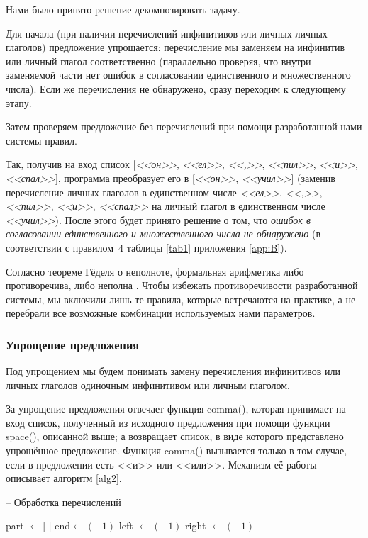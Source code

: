 \documentclass[main]{subfiles}
\begin{document}
Нами было принято решение декомпозировать задачу. 

Для начала (при наличии перечислений инфинитивов или личных личных глаголов) предложение упрощается: перечисление мы заменяем на инфинитив или личный глагол соответственно (параллельно проверяя, что внутри заменяемой части нет ошибок в согласовании единственного и множественного числа). Если же перечисления не обнаружено, сразу переходим к следующему этапу.

Затем проверяем предложение без перечислений при помощи разработанной нами системы правил. 

Так, получив на вход список [\textit{<<он>>}, \textit{<<ел>>}, \textit{<<,>>}, \textit{<<пил>>}, \textit{<<и>>}, \textit{<<спал>>}], программа преобразует его в [\textit{<<он>>}, \textit{<<учил>>}] (заменив перечисление личных глаголов в единственном числе \textit{<<ел>>}, \textit{<<,>>}, \textit{<<пил>>}, \textit{<<и>>}, \textit{<<спал>>} на личный глагол в единственном числе \textit{<<учил>>}). После этого будет принято решение о том, что \textit{ошибок в согласовании единственного и множественного числа не обнаружено} (в соответствии с правилом~4 таблицы \ref{tab1} приложения \ref{app:B}).

Согласно теореме Гёделя о неполноте, формальная арифметика либо противоречива, либо неполна \cite{forms}. Чтобы избежать противоречивости разработанной системы, мы включили лишь те правила, которые встречаются на практике, а не перебрали все возможные комбинации используемых нами параметров.

\subsubsection{Упрощение предложения}
Под упрощением мы будем понимать замену перечисления инфинитивов или личных глаголов одиночным инфинитивом или личным глаголом. 

За упрощение предложения отвечает функция comma(), которая принимает на вход список, полученный из исходного предложения при помощи функции space(), описанной выше; а возвращает список, в виде которого представлено упрощённое предложение. Функция comma() вызывается только в том случае, если в предложении есть <<и>> или <<или>>. Механизм её работы описывает алгоритм \ref{alg2}.

\begin{algorithm}[!h]
	\caption{-- Обработка перечислений}\label{alg2}
	\begin{algorithmic}[1]
		 
		\State part $\gets [$ $]$ 
		\State end$\gets (-1)$ 
		\State left $\gets (-1)$ 
		\State right $\gets (-1)$
	\end{algorithmic}
\end{algorithm}
\end{document}
